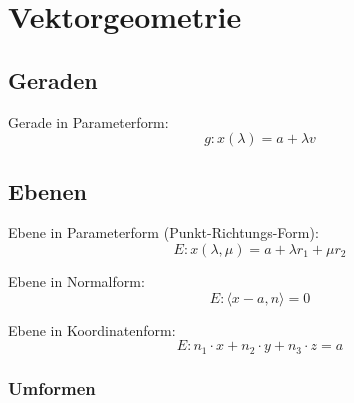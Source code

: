 \documentclass[a4paper, twocolumn]{article}
\begin{document}
\section{Vektorgeometrie}

\subsection{Geraden}
    Gerade in Parameterform:
    \begin{displaymath}
       g\colon x(\lambda) = a + \lambda v
    \end{displaymath}


\subsection{Ebenen}
    Ebene in Parameterform (Punkt-Richtungs-Form):
    \begin{displaymath}
       E:	x(\lambda, \mu) = a + \lambda r_1 + \mu r_2
    \end{displaymath}
    
    Ebene in Normalform:
    \begin{displaymath}
       E:	\langle x - a, n \rangle = 0
    \end{displaymath}
    
    Ebene in Koordinatenform:
    \begin{displaymath}
       E: n_1 \cdot x + n_2 \cdot y + n_3 \cdot z = a
    \end{displaymath}

   \subsubsection{Umformen}
\end{document}
